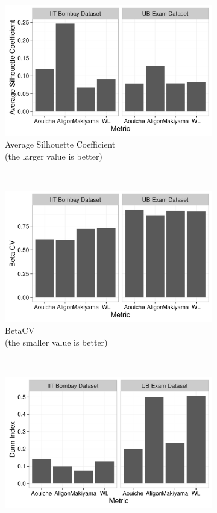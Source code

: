 \begin{figure}[h!]
	\captionsetup[subfigure]{justification=centering}
    \centering
    \begin{subfigure}[b]{0.3\textwidth}
        \centering
        \includegraphics[width=\textwidth]{graphics/silhouette3}
        \caption{Average Silhouette Coefficient\\(the larger value is better)}
    \end{subfigure}%
    ~
    \begin{subfigure}[b]{0.3\textwidth}
        \centering
        \includegraphics[width=\textwidth]{graphics/beta_cv3}
        \caption{BetaCV\\(the smaller value is better)}
    \end{subfigure}
    ~
    \begin{subfigure}[b]{0.3\textwidth}
        \centering
        \includegraphics[width=\textwidth]{graphics/dunn3}

\end{subfigure}
\end{figure}

